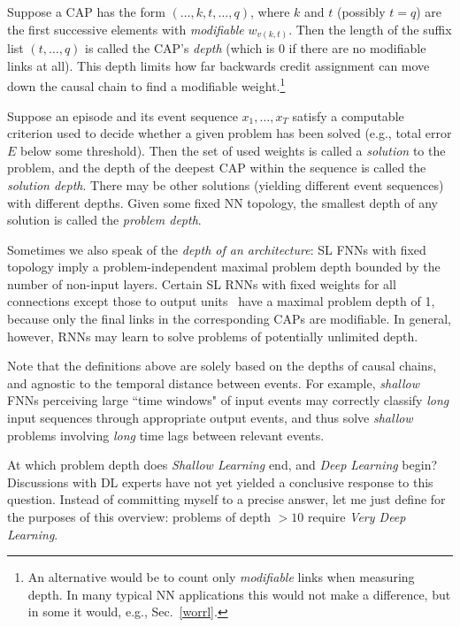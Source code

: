 \documentclass[letterpaper]{article}
\begin{document}
Suppose a CAP has the form $(\ldots,k,t,\ldots,q)$, where
$k$ and $t$ (possibly $t=q$) are the first successive elements 
with {\em modifiable} $w_{v(k,t)}$. Then the 
length of the suffix list $(t,\ldots, q)$ is called the CAP's {\em depth}
(which is 0 if there are no modifiable links at all).
This depth limits how far backwards credit assignment 
can move down the causal chain 
to find a modifiable 
weight.\footnote{An alternative would be to count only {\em modifiable} links when measuring depth. In many 
typical NN applications this would not make a difference, but in some it would, e.g., Sec.~\ref{worrl}.}

Suppose an episode and its event sequence $x_1,\ldots,x_T$ satisfy a computable criterion 
used to decide whether a given problem has been solved 
(e.g., total error $E$ below some threshold). 
Then the set of used weights is called a {\em solution} to the problem, 
and the depth of the deepest CAP within the sequence is called the {\em solution depth}. 
There may be other solutions (yielding different event sequences) with different depths.
Given some fixed NN topology,
the  smallest depth of any solution is called the {\em problem depth}.



Sometimes we also speak of the {\em depth of an architecture}:
SL FNNs with fixed topology imply a problem-independent maximal problem depth bounded by
 the number of non-input layers.
Certain SL RNNs
with fixed weights for all 
connections except those to output units~\citep{Jaeger2001a,maass2002,Jaeger:04,schrauwen2007} 
have
a maximal problem depth of 1,
because only the final links in the corresponding CAPs are modifiable. 
In general, however, RNNs 
may learn to solve problems of potentially unlimited depth.

Note that the definitions above are 
solely based on the depths of causal chains, and
agnostic to the temporal distance between events.
For example, {\em shallow} FNNs perceiving large ``time windows" of input events may 
correctly classify {\em long} input sequences through appropriate output events, and thus 
solve {\em shallow}
problems involving {\em long} time lags between relevant events.

At which problem depth does {\em Shallow Learning} end, and {\em Deep Learning} begin?
Discussions with DL
experts have not yet yielded a conclusive response to this question. Instead of committing myself to a precise 
answer, let me just define for the purposes of this overview:
problems of depth $>10$ require 
{\em Very Deep Learning}.
\end{document}
